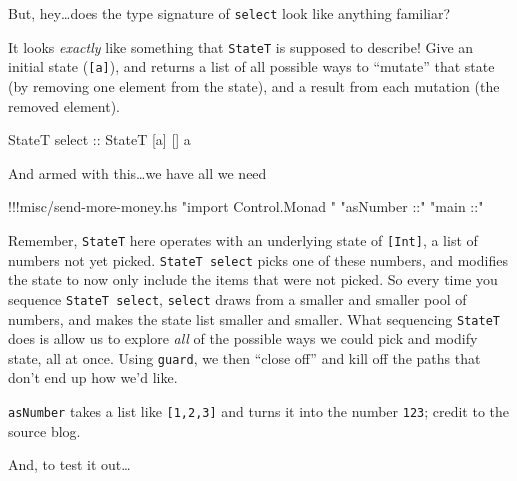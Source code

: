 \documentclass[]{article}
\newenvironment{Shaded}{}{}
\newcommand{\KeywordTok}[1]{\textcolor[rgb]{0.00,0.44,0.13}{\textbf{{#1}}}}
\newcommand{\DataTypeTok}[1]{\textcolor[rgb]{0.56,0.13,0.00}{{#1}}}
\newcommand{\StringTok}[1]{\textcolor[rgb]{0.25,0.44,0.63}{{#1}}}
\newcommand{\CommentTok}[1]{\textcolor[rgb]{0.38,0.63,0.69}{\textit{{#1}}}}
\newcommand{\OtherTok}[1]{\textcolor[rgb]{0.00,0.44,0.13}{{#1}}}
\newcommand{\FunctionTok}[1]{\textcolor[rgb]{0.02,0.16,0.49}{{#1}}}
\newcommand{\NormalTok}[1]{{#1}}
\begin{document}
But, hey\ldots{}does the type signature of \texttt{select} look like
anything familiar?

It looks \emph{exactly} like something that \texttt{StateT} is supposed
to describe! Give an initial state (\texttt{{[}a{]}}), and returns a
list of all possible ways to ``mutate'' that state (by removing one
element from the state), and a result from each mutation (the removed
element).

\begin{Shaded}
\begin{Highlighting}[]
\DataTypeTok{StateT}\OtherTok{ select ::} \DataTypeTok{StateT} \NormalTok{[a] [] a}
\end{Highlighting}
\end{Shaded}

And armed with this\ldots{}we have all we need

\begin{Shaded}
\begin{Highlighting}[]
\FunctionTok{!!!}\NormalTok{misc}\FunctionTok{/}\NormalTok{send}\FunctionTok{-}\NormalTok{more}\FunctionTok{-}\NormalTok{money}\FunctionTok{.}\NormalTok{hs }\StringTok{"import Control.Monad "} \StringTok{"asNumber ::"} \StringTok{"main ::"}
\end{Highlighting}
\end{Shaded}

Remember, \texttt{StateT} here operates with an underlying state of
\texttt{{[}Int{]}}, a list of numbers not yet picked.
\texttt{StateT\ select} picks one of these numbers, and modifies the
state to now only include the items that were not picked. So every time
you sequence \texttt{StateT\ select}, \texttt{select} draws from a
smaller and smaller pool of numbers, and makes the state list smaller
and smaller. What sequencing \texttt{StateT} does is allow us to explore
\emph{all} of the possible ways we could pick and modify state, all at
once. Using \texttt{guard}, we then ``close off'' and kill off the paths
that don't end up how we'd like.

\texttt{asNumber} takes a list like \texttt{{[}1,2,3{]}} and turns it
into the number \texttt{123}; credit to the source blog.

And, to test it out\ldots{}

\begin{Shaded}
\end{Shaded}
\end{document}
